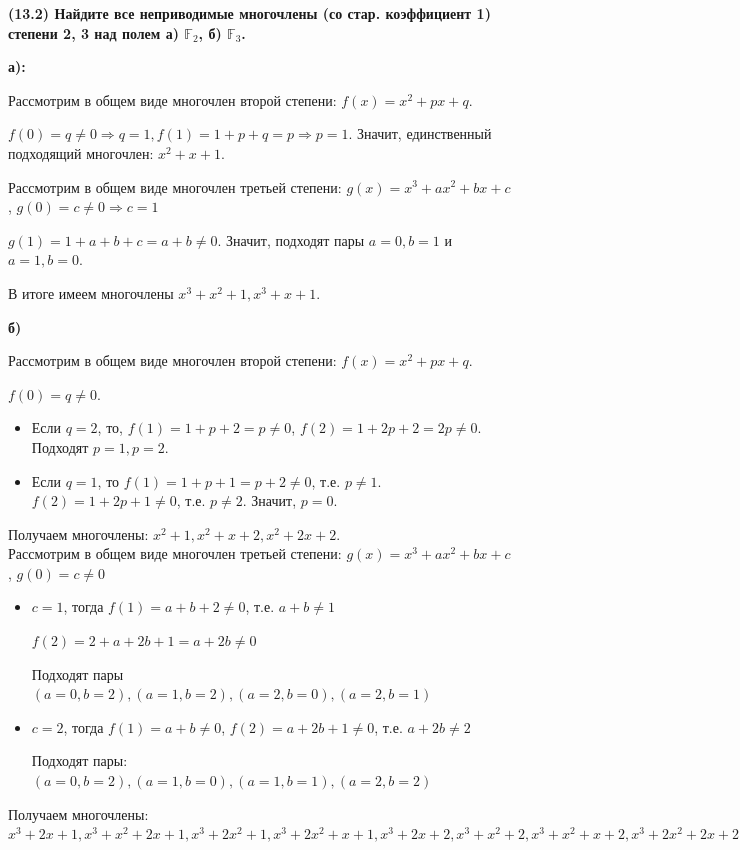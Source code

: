\textbf{(13.2) Найдите все неприводимые многочлены (со стар. коэффициент 1) степени 2, 3 над полем
а) $\mathbb{F}_2$, б) $\mathbb{F}_3$.}

\textbf{а):}

Рассмотрим в общем виде многочлен второй степени: $f(x) = x^2 + px + q$. 

$f(0) = q \neq 0 \Rightarrow q = 1, f(1) = 1 + p + q = p \Rightarrow p = 1$. Значит, единственный подходящий многочлен: $x^2 + x + 1$.

Рассмотрим в общем виде многочлен третьей степени: $g(x) = x^3 + ax^2 + bx + c$, $g(0) = c \neq 0 \Rightarrow c = 1$

$g(1) = 1 + a + b + c = a + b \neq 0$. Значит, подходят пары $a = 0, b = 1$ и $a = 1, b = 0$.

В итоге имеем многочлены $x^3 + x^2 + 1, x^3 + x + 1$.

\textbf{б)}

Рассмотрим в общем виде многочлен второй степени: $f(x) = x^2 + px + q$. 

$f(0) = q \neq 0$. 
\begin{itemize}
    \item Если $q = 2$, то, $f(1) = 1 + p + 2 = p \neq 0$, $f(2) = 1 + 2p + 2 = 2p \neq 0$. Подходят $p = 1, p = 2$.
    \item Если $q = 1$, то $f(1) = 1 + p + 1 = p + 2 \neq 0$, т.е. $p \neq 1$. $f(2) = 1 + 2p + 1 \neq 0$, т.е. $p \neq 2$. Значит, $p = 0$.
\end{itemize}

Получаем многочлены: $x^2 + 1, x^2 + x + 2, x^2 + 2x + 2$.\\

Рассмотрим в общем виде многочлен третьей степени: $g(x) = x^3 + ax^2 + bx + c$, $g(0) = c \neq 0$

\begin{itemize}
    \item $c = 1$, тогда $f(1) = a + b + 2 \neq 0$, т.е. $a + b \neq 1$
    
    $f(2) = 2 + a + 2b + 1 = a + 2b \neq 0$
    
    Подходят пары $(a = 0, b = 2), (a = 1, b = 2), (a = 2, b = 0), (a = 2, b = 1)$
    \item $c = 2$, тогда $f(1) = a + b \neq 0$, $f(2) = a + 2b + 1 \neq 0$, т.е. $a + 2b \neq 2$
    
    Подходят пары: $(a = 0, b = 2), (a = 1, b = 0), (a = 1, b = 1), (a = 2, b = 2)$
\end{itemize}

Получаем многочлены: $x^3 + 2x + 1, x^3 + x^2 + 2x + 1, x^3 + 2x^2 + 1, x^3 + 2x^2 + x + 1, x^3 + 2x + 2, x^3 + x^2 + 2, x^3 + x^2 + x + 2, x^3 + 2x^2 + 2x + 2$
